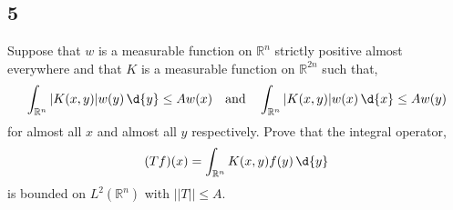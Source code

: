 \documentclass[12pt]{article}
\newcommand{\R}{\mathbb{R}}
\begin{document}
\subsection{5}


\begin{exercise}
Suppose that $w$ is a measurable function on $\R^n$ strictly positive almost everywhere and that $K$ is a measurable function on $\R^{2n}$ such that,
\[ \int_{\R^n} |K(x,y)| w(y) \, \d{y} \le A w(x) \quad \text{and} \quad \int_{\R^n} |K(x,y)| w(x) \, \d{x} \le A w(y) \]
for almost all $x$ and almost all $y$ respectively. Prove that the integral operator,
\[ (T f)(x) = \int_{\R^n} K(x, y) f(y) \, \d{y} \]
is bounded on $L^2(\R^n)$ with $|| T || \le A$. 
\end{exercise}
\end{document}

